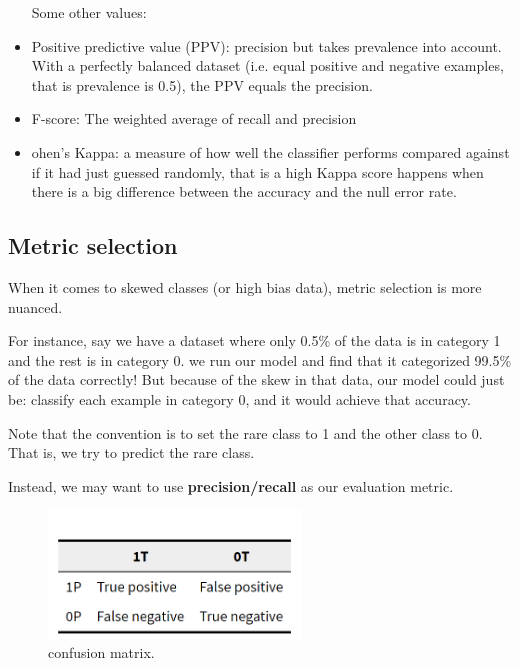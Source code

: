 \begin{itemize}
Some other values:\\

\item Positive predictive value (PPV): precision but takes prevalence into account. With a perfectly balanced dataset (i.e. equal positive and negative examples, that is prevalence is 0.5), the PPV equals the precision.

\item F-score: The weighted average of recall and precision

\item ohen's Kappa: a measure of how well the classifier performs compared against if it had just guessed randomly, that is a high Kappa score happens when there is a big difference between the accuracy and the null error rate.

\end{itemize}

\subsection{Metric selection}
When it comes to skewed classes (or high bias data), metric selection is more nuanced.

For instance, say we have a dataset where only 0.5\% of the data is in category 1 and the rest is in category 0. we run our model and find that it categorized 99.5\% of the data correctly! But because of the skew in that data, our model could just be: classify each example in category 0, and it would achieve that accuracy.

Note that the convention is to set the rare class to 1 and the other class to 0. That is, we try to predict the rare class.

Instead, we may want to use \textbf{precision/recall} as our evaluation metric.

\begin{figure}[H]
\centering
\includegraphics[width=0.6\textwidth]{img/TP.PNG}
\caption{  confusion matrix.}
\label{fig:TP}
\end{figure}

